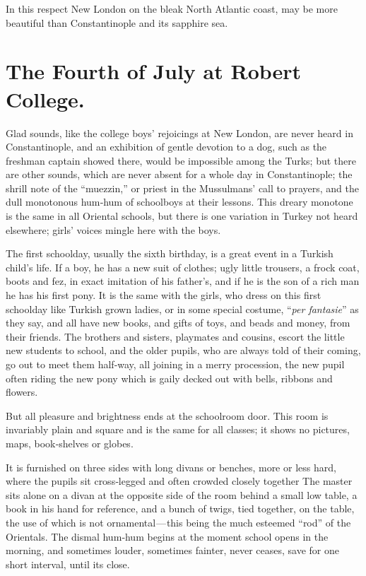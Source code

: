 \documentclass[12pt]{book}
\begin{document}
In this respect New London on the bleak North Atlantic coast, may be more
beautiful than Constantinople and its sapphire sea.

\chapter{The Fourth of July at Robert College.}

Glad sounds, like the college boys’ rejoicings at New London, are never heard
in Constantinople, and an exhibition of gentle devotion to a dog, such as the
freshman captain showed there, would be impossible among the Turks; but there
are other sounds, which are never absent for a whole day in Constantinople; the
shrill note of the “muezzin,” or priest in the Mussulmans’ call to prayers, and the
dull monotonous hum‐hum of schoolboys at their lessons. This dreary monotone
is the same in all Oriental schools, but there is one variation in Turkey not heard
elsewhere; girls’ voices mingle here with the boys.

The first schoolday, usually the sixth birthday, is a great event in a Turkish
child’s life. If a boy, he has a new suit of clothes; ugly little trousers, a frock coat,
boots and fez, in exact imitation of his father’s, and if he is the son of a rich man
he has his first pony. It is the same with the girls, who dress on this first schoolday
like Turkish grown ladies, or in some special costume, “{\it per fantasie}” as they say,
and all have new books, and gifts of toys, and beads and money, from their friends.
The brothers and sisters, playmates and cousins, escort the little new students to
school, and the older pupils, who are always told of their coming, go out to meet
them half‐way, all joining in a merry procession, the new pupil often riding the
new pony which is gaily decked out with bells, ribbons and flowers.

But all pleasure and brightness ends at the schoolroom door. This room is
invariably plain and square and is the same for all classes; it shows no pictures,
maps, book‐shelves or globes.

It is furnished on three sides with long divans or benches, more or less hard,
where the pupils sit cross‐legged and often crowded closely together The master
sits alone on a divan at the opposite side of the room behind a small low table,
a book in his hand for reference, and a bunch of twigs, tied together, on the
table, the use of which is not ornamental — this being the much esteemed “rod” of
the Orientals. The dismal hum‐hum begins at the moment school opens in the
morning, and sometimes louder, sometimes fainter, never ceases, save for one
short interval, until its close.
\end{document}
